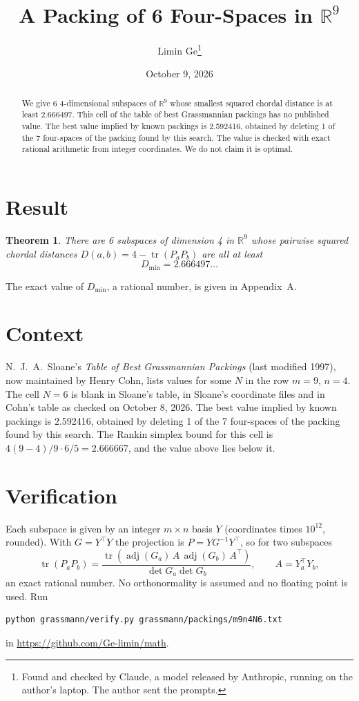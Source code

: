 \documentclass[11pt,a4paper]{article}
\title{A Packing of 6 Four-Spaces in $\mathbb{R}^{9}$}
\author{Limin Ge\thanks{Found and checked by Claude, a model released by Anthropic, running on the author's laptop. The author sent the prompts.}}
\date{October 9, 2026}
\newtheorem*{theorem}{Theorem}
\begin{document}
\maketitle
\begin{abstract}
We give 6 4-dimensional subspaces of $\mathbb{R}^{9}$ whose smallest squared chordal distance is at least 2.666497. This cell of the table of best Grassmannian packings has no published value. The best value implied by known packings is 2.592416, obtained by deleting 1 of the 7 four-spaces of the packing found by this search. The value is checked with exact rational arithmetic from integer coordinates. We do not claim it is optimal.
\end{abstract}

\section{Result}
\begin{theorem}
There are 6 subspaces of dimension 4 in $\mathbb{R}^{9}$ whose pairwise squared chordal distances $D(a,b) = 4 - \operatorname{tr}(P_aP_b)$ are all at least
\[ D_{\min} = 2.666497\ldots \]
\end{theorem}
The exact value of $D_{\min}$, a rational number, is given in Appendix~A.


\section{Context}
N.~J.~A.~Sloane's \emph{Table of Best Grassmannian Packings} (last modified 1997), now maintained by Henry Cohn, lists values for some $N$ in the row $m=9$, $n=4$. The cell $N=6$ is blank in Sloane's table, in Sloane's coordinate files and in Cohn's table as checked on October 8, 2026. The best value implied by known packings is 2.592416, obtained by deleting 1 of the 7 four-spaces of the packing found by this search. The Rankin simplex bound for this cell is $4(9-4)/9\cdot 6/5 = 2.666667$, and the value above lies below it.


\section{Verification}
Each subspace is given by an integer $m\times n$ basis $Y$ (coordinates times $10^{12}$, rounded). With $G=Y^\top Y$ the projection is $P=YG^{-1}Y^\top$, so for two subspaces
\[ \operatorname{tr}(P_aP_b)=\frac{\operatorname{tr}(\operatorname{adj}(G_a)\,A\,\operatorname{adj}(G_b)\,A^\top)}{\det G_a\det G_b},\qquad A=Y_a^\top Y_b, \]
an exact rational number. No orthonormality is assumed and no floating point is used. Run
\begin{verbatim}
python grassmann/verify.py grassmann/packings/m9n4N6.txt
\end{verbatim}
in \url{https://github.com/Ge-limin/math}.
\end{document}
